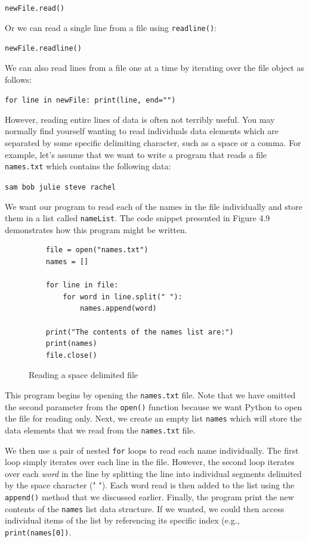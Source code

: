 \documentclass{book}
\begin{document}
\texttt{newFile.read()}

Or we can read a single line from a file using \texttt{readline()}:

\texttt{newFile.readline()}

We can also read lines from a file one at a time by iterating over the file object as follows:

\texttt{for line in newFile:   print(line, end="")}

However, reading entire lines of data is often not terribly useful. You may normally find yourself wanting to read individuals data elements which are separated by some specific delimiting character, such as a space or a comma. For example, let's assume that we want to write a program that reads a file \texttt{names.txt} which contains the following data:

\texttt{sam bob julie steve rachel}

We want our program to read each of the names in the file individually and store them in a list called \texttt{nameList}. The code snippet presented in Figure 4.9 demonstrates how this program might be written.

\begin{figure}[h]
\caption{Reading a space delimited file}
\begin{lstlisting}
	file = open("names.txt")
	names = []

	for line in file:
		for word in line.split(" "):
			names.append(word)

	print("The contents of the names list are:")
	print(names)
	file.close()
	\end{lstlisting}
\end{figure}

This program begins by opening the \texttt{names.txt} file. Note that we have omitted the second parameter from the \texttt{open()} function because we want Python to open the file for reading only. Next, we create an empty list \texttt{names} which will store the data elements that we read from the \texttt{names.txt} file.

We then use a pair of nested \texttt{for} loops to read each name individually. The first loop simply iterates over each line in the file. However, the second loop iterates over each \textit{word} in the line by splitting the line into individual segments delimited by the space character (" "). Each word read is then added to the list using the \texttt{append()} method that we discussed earlier. Finally, the program print the new contents of the \texttt{names} list data structure. If we wanted, we could then access individual items of the list by referencing its specific index (e.g., \texttt{print(names[0])}.
\end{document}
